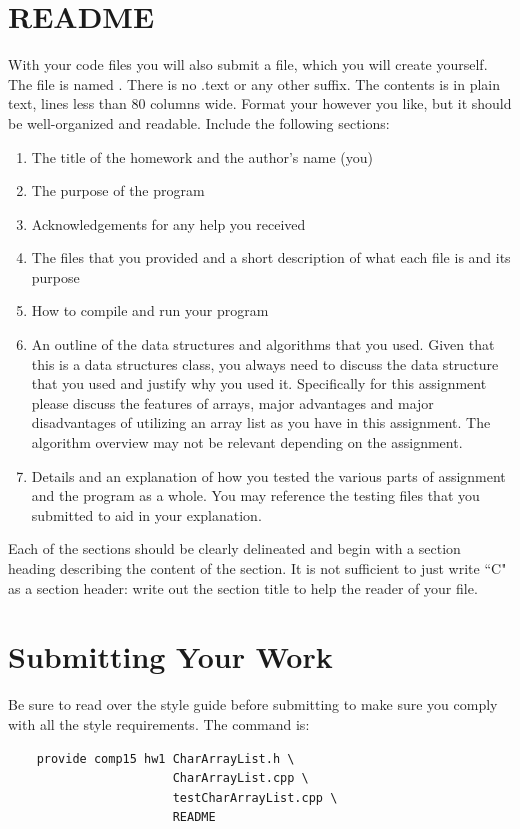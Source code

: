 \documentclass[11pt]{report}
\begin{document}
\section*{README}
    With your code files you will also submit a  file, which you
    will create yourself.  The file is named .  There is no .text
    or any other suffix.  The contents is in plain text, lines less than
    80 columns wide.  Format your  however you like, but it should
    be well-organized and readable.  Include the following sections:
    \begin{enumerate}[label=(\Alph*)]
        \item The title of the homework and the author's name (you)
        \item The purpose of the program
        \item Acknowledgements for any help you received
        \item The files that you provided and a short description of what 
           each file is and its purpose
        \item How to compile and run your program
        \item An outline of the data structures and algorithms that you used. 
           Given that this is a data structures class, you always need to
           discuss the data structure that you used and justify why
           you used it.  Specifically for this assignment please
           discuss the features of arrays, major advantages and major
           disadvantages of utilizing an array list as you have in this
           assignment.  The algorithm overview may not be relevant
           depending on the assignment. 
        \item Details and an explanation of how you tested the various parts 
           of assignment and the program as a whole. You may reference 
           the testing files that you submitted to aid in your explanation.
    \end{enumerate}
    Each of the sections should be clearly delineated and begin with a
    section heading describing the content of the section.  It is not
    sufficient to just write ``C" as a section header:  write out the
    section title to help the reader of your file.
    
\section*{Submitting Your Work}
Be sure to read over the style guide before submitting to make sure you comply with all the style requirements. The command is:
\begin{lstlisting}
    provide comp15 hw1 CharArrayList.h \
                       CharArrayList.cpp \
                       testCharArrayList.cpp \
                       README
\end{lstlisting}
\end{document}
